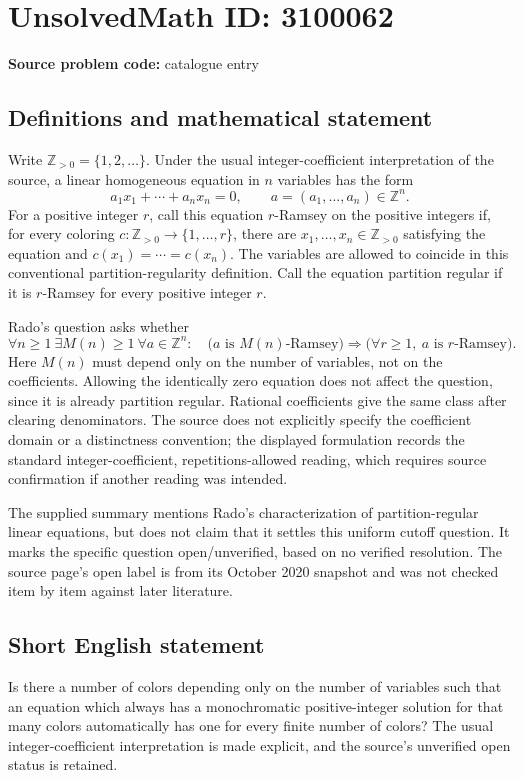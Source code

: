 \documentclass[11pt]{article}
\begin{document}
\section*{UnsolvedMath ID: 3100062}
\textbf{Source problem code:} catalogue entry
\subsection{Definitions and mathematical statement}
Write \(\mathbb Z_{>0}=\{1,2,\ldots\}\). Under the usual integer-coefficient interpretation of the source, a linear homogeneous equation in \(n\) variables has the form
\[
 a_1x_1+\cdots+a_nx_n=0,\qquad a=(a_1,\ldots,a_n)\in\mathbb Z^n.
\]
For a positive integer \(r\), call this equation \(r\)-Ramsey on the positive integers if, for every coloring \(c:\mathbb Z_{>0}\to\{1,\ldots,r\}\), there are \(x_1,\ldots,x_n\in\mathbb Z_{>0}\) satisfying the equation and \(c(x_1)=\cdots=c(x_n)\). The variables are allowed to coincide in this conventional partition-regularity definition. Call the equation partition regular if it is \(r\)-Ramsey for every positive integer \(r\).

Rado's question asks whether
\[
\forall n\ge1\ \exists M(n)\ge1\ \forall a\in\mathbb Z^n:
\quad\bigl(a\text{ is }M(n)\text{-Ramsey}\bigr)
\Longrightarrow
\bigl(\forall r\ge1,\ a\text{ is }r\text{-Ramsey}\bigr).
\]
Here \(M(n)\) must depend only on the number of variables, not on the coefficients. Allowing the identically zero equation does not affect the question, since it is already partition regular. Rational coefficients give the same class after clearing denominators. The source does not explicitly specify the coefficient domain or a distinctness convention; the displayed formulation records the standard integer-coefficient, repetitions-allowed reading, which requires source confirmation if another reading was intended.

The supplied summary mentions Rado's characterization of partition-regular linear equations, but does not claim that it settles this uniform cutoff question. It marks the specific question open/unverified, based on no verified resolution. The source page's open label is from its October 2020 snapshot and was not checked item by item against later literature.
\subsection{Short English statement}
Is there a number of colors depending only on the number of variables such that an equation which always has a monochromatic positive-integer solution for that many colors automatically has one for every finite number of colors? The usual integer-coefficient interpretation is made explicit, and the source's unverified open status is retained.
\end{document}
